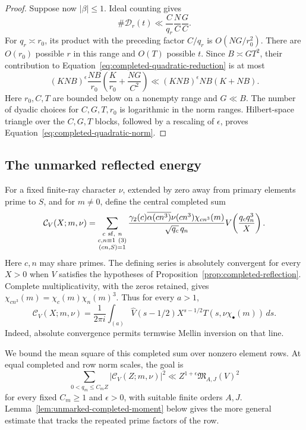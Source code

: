 \documentclass[11pt,a4paper]{article}
\numberwithin{equation}{section}
\numberwithin{figure}{section}
\theoremstyle{definition}
\theoremstyle{remark}
\begin{document}
\begin{proof}
Suppose now $|\beta|\le1$.  Ideal counting gives
\[
 \#\mathcal D_r(t)\ll
       \frac C{q_r}\frac NC\frac GC.
\]
For $q_r\asymp r_0$, its product with the preceding factor $C/q_r$ is
$O(NG/r_0^2)$.  There are $O(r_0)$ possible $r$ in this range and $O(T)$
possible $t$.  Since $B\asymp GT^2$, their contribution to
Equation~\eqref{eq:completed-quadratic-reduction} is at most
\[
 (KNB)^\epsilon\frac{NB}{r_0}
       \left(\frac K{r_0}+\frac{NG}{C^2}\right)
 \ll (KNB)^\epsilon NB(K+NB).
\]
Here $r_0,C,T$ are bounded below on a nonempty range and $G\ll B$.
The number of dyadic choices for $C,G,T,r_0$ is logarithmic in the norm
ranges.  Hilbert-space triangle over the $C,G,T$ blocks, followed by a
rescaling of $\epsilon$, proves Equation~\eqref{eq:completed-quadratic-norm}.
\end{proof}

\subsection{The unmarked reflected energy}

For a fixed finite-ray character $\nu$, extended by zero away from primary
elements prime to $S$, and for $m\ne0$, define the central completed sum
\begin{equation}\label{eq:unmarked-central-completion}
 \mathcal C_V(X;m,\nu)=
 \sum_{\substack{c\ {\rm sf},\ n\\c,n\equiv1\ (3)\\(cn,S)=1}}
 \frac{\gamma_2(c)\overline{\alpha(cn^3)}\nu(cn^3)\chi_{cn^3}(m)}
      {\sqrt{q_c}\,q_n}
 V\!\left(\frac{q_cq_n^3}{X}\right).
\end{equation}
Here $c,n$ may share primes.  The defining series is absolutely convergent
for every $X>0$ when $V$ satisfies the hypotheses of
Proposition~\ref{prop:completed-reflection}.  Complete multiplicativity,
with the zeros retained, gives
$\chi_{cn^3}(m)=\chi_c(m)\chi_n(m)^3$.  Thus for every $a>1$,
\begin{equation}\label{eq:unmarked-central-mellin}
 \mathcal C_V(X;m,\nu)=\frac1{2\pi i}\int_{(a)}
 \widehat V(s-1/2)X^{s-1/2}T(s,\nu\chi_\bullet(m))\,ds.
\end{equation}
Indeed, absolute convergence permits termwise Mellin inversion on that line.


We bound the mean square of this completed sum over nonzero element rows.
At equal completed and row norm scales, the goal is
\[
 \sum_{0<q_m\le C_mZ}|\mathcal C_V(Z;m,\nu)|^2
 \ll Z^{1+\epsilon}\mathfrak M_{A,J}(V)^2
\]
for every fixed $C_m\ge1$ and $\epsilon>0$, with suitable finite orders
$A,J$.  Lemma~\ref{lem:unmarked-completed-moment} below gives the more
general estimate that tracks the repeated prime factors of the row.
\end{document}

